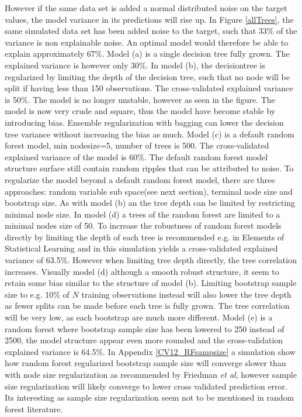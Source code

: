 However if the same data set is added a normal distributed noise on the target values, the model variance in its predictions will rise up. In Figure \ref{allTrees}, the same simulated data set has been added noise to the target, such that 33\% of the variance is non explainable noise. An optimal model would therefore be able to explain approximately 67\%. Model (a) is a single decision tree fully grown. The explained variance is however only 30\%. In model (b), the decisiontree is regularized by limiting the depth of the decision tree, such that no node will be split if having less than 150 observations. The cross-validated explained variance is 50\%. The model is no longer unstable, however as seen in the figure. The model is now very crude and square, thus the model have become stable by introducing bias. Ensemble regularization with bagging can lower the decision tree variance without increasing the bias as much.  Model (c) is a default random forest model, min nodesize=5, number of trees is 500. The cross-validated explained variance of the model is 60\%. The default random forest model structure surface still contain random ripples that can be attributed to noise. To regularize the model beyond a default random forest model, there are three approaches: random variable sub space(see next section), terminal node size and bootstrap size. As with model (b) an the tree depth can be limited by restricting minimal node size. In model (d) a trees of the random forest are limited to a minimal nodes size of 50. To increase the robustness of random forest models directly by limiting the depth of each tree is recommended e.g. in Elements of Statistical Learning \cite{friedman2001elements} and in this simulation yields a cross-validated explained variance of 63.5\%. However when limiting tree depth directly, the tree correlation increases. Visually model (d) although a smooth robust structure, it seem to retain some bias similar to the structure of model (b). Limiting bootstrap sample size to e.g. 10\% of $N$ training observations instead will also lower the tree depth as fewer splits can be made before each tree is fully grown. The tree correlation will be very low, as each bootstrap are much more different. Model (e) is a random forest where bootstrap sample size has been lowered to 250 instead of 2500, the model structure appear even more rounded and the cross-validation explained variance is 64.5\%. In Appendix \ref{CV12_RFsampsize} a simulation show how random forest regularized bootstrap sample size will converge slower than with node size regularization as recommended by Friedman \textit{et al}, however sample size regularization will likely converge to lower cross validated prediction error. Its interesting as sample size regularization seem not to be mentioned in random forest literature.

